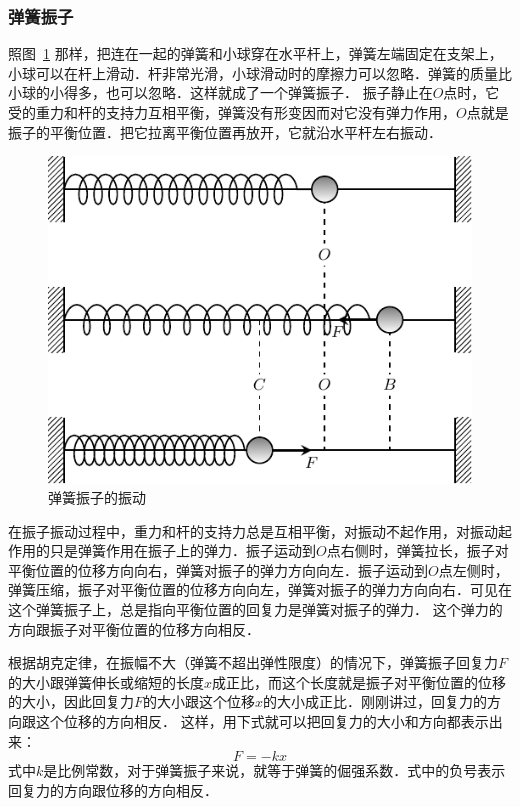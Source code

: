 \subsubsection{弹簧振子} 

照图~\ref{fig_A_9-2} 那样，把连在一起的弹簧和小球穿在水平杆上，弹簧左端固定在支架上，小球可以在杆上滑动．杆非常光滑，小球滑动时的摩擦力可以忽略．弹簧的质量比小球的小得多，也可以忽略．这样就成了一个弹簧振子．
振子静止在$O$点时，它受的重力和杆的支持力互相平衡，弹簧没有形变因而对它没有弹力作用，$O$点就是振子的平衡位置．把它拉离平衡位置再放开，它就沿水平杆左右振动．


\begin{figure}[htbp]
	\centering
	\includegraphics{fig/A/9-2.pdf}
	\caption{弹簧振子的振动}\label{fig_A_9-2}
\end{figure}


在振子振动过程中，重力和杆的支持力总是互相平衡，对振动不起作用，对振动起作用的只是弹簧作用在振子上的弹力．振子运动到$O$点右侧时，弹簧拉长，振子对平衡位置的位移方向向右，弹簧对振子的弹力方向向左．振子运动到$O$点左侧时，弹簧压缩，振子对平衡位置的位移方向向左，弹簧对振子的弹力方向向右．可见在这个弹簧振子上，总是指向平衡位置的回复力是弹簧对振子的弹力．
这个弹力的方向跟振子对平衡位置的位移方向相反．

根据胡克定律，在振幅不大（弹簧不超出弹性限度）的情况下，弹簧振子回复力$F$的大小跟弹簧伸长或缩短的长度$x$成正比，而这个长度就是振子对平衡位置的位移的大小，因此回复力$F$的大小跟这个位移$x$的大小成正比．刚刚讲过，回复力的方向跟这个位移的方向相反．
这样，用下式就可以把回复力的大小和方向都表示出来：
\[F=-kx\]
式中$k$是比例常数，对于弹簧振子来说，就等于弹簧的倔强系数．式中的负号表示回复力的方向跟位移的方向相反．

